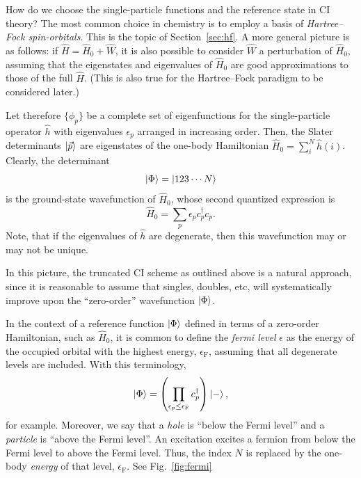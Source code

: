 \documentclass{report}
\theoremstyle{plain}
\theoremstyle{definition}
\begin{document}
How do we choose the single-particle functions and the reference state
in CI theory? The most common choice in chemistry is to employ a basis
of \emph{Hartree--Fock spin-orbitals}. This is the topic of
Section~\ref{sec:hf}. A more general picture is as follows: if $\hat{H} = \hat{H}_0 + \hat{W}$, it
is also possible to consider $\hat{W}$ a perturbation of $\hat{H}_0$,
assuming that the eigenstates and eigenvalues of $\hat{H}_0$ are good
approximations to those of the full $\hat{H}$. (This is also true for
the Hartree--Fock paradigm to be considered later.)

Let therefore $\{\phi_p\}$ be a complete set of eigenfunctions for
the single-particle operator $\hat{h}$ with eigenvalues $\epsilon_p$
arranged in increasing order. Then, the Slater determinants
$\ket{\vec{p}}$ are eigenstates of the one-body Hamiltonian
$\hat{H}_0 = \sum_i^N \hat{h}(i)$. Clearly, the determinant
\begin{equation}
  \ket{\Phi} = \ket{123\cdots N}
\end{equation}
is the ground-state wavefunction of $\hat{H}_0$, whose second
quantized expression is
\begin{equation}
  \hat{H}_0 = \sum_p \epsilon_p c^\dag_p c_p.
\end{equation}
Note, that if the
eigenvalues of $\hat{h}$ are degenerate, then this wavefunction may or
may not be unique.

In this picture, the truncated CI scheme as outlined above is a
natural approach, since it is reasonable to assume that singles,
doubles, etc, will systematically improve upon the ``zero-order''
wavefunction $\ket{\Phi}$.

In the context of a reference function $\ket{\Phi}$ defined in terms
of a zero-order Hamiltonian, such as $\hat{H}_0$, it is common to
define the \emph{fermi level} $\epsilon$ as the energy of the occupied
orbital with the highest energy, $\epsilon_\text{F}$, assuming
that all degenerate levels are included. With this terminology,
\begin{equation}
  \ket{\Phi} = \left(\prod_{\epsilon_p \leq \epsilon_\text{F}} c^\dag_p\right) \ket{-},
\end{equation}
for example. Moreover, we say that a \emph{hole} is ``below the Fermi
level'' and a \emph{particle} is ``above the Fermi level''. An
excitation excites a fermion from below the Fermi level to above the
Fermi level. Thus, the index $N$ is replaced by the one-body
\emph{energy} of that level, $\epsilon_{\text{F}}$. See Fig.~\ref{fig:fermi}
\end{document}
